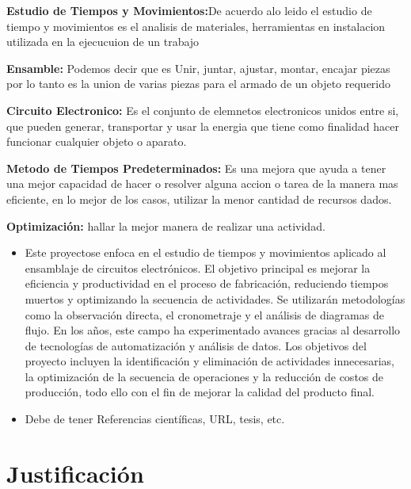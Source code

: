     \item \textbf{Estudio de Tiempos y Movimientos:}De acuerdo alo leido el estudio de tiempo y movimientos es el analisis de materiales, herramientas en instalacion utilizada en la ejecucuion de un trabajo 
    \item \textbf{Ensamble:} Podemos decir que es Unir, juntar, ajustar, montar, encajar piezas por lo tanto es la union de varias piezas para el armado de un objeto requerido
    \item \textbf{Circuito Electronico:} Es el conjunto de elemnetos electronicos unidos entre si, que pueden generar, transportar y usar la energia que tiene como finalidad hacer funcionar cualquier objeto o aparato. 
    \item \textbf{Metodo de Tiempos Predeterminados:}
    Es una mejora que ayuda a tener una mejor capacidad de hacer o resolver alguna accion o tarea de la manera mas eficiente, en lo mejor de los casos, utilizar la menor cantidad de recursos dados.
    \item \textbf{Optimización:}
    hallar la mejor manera de realizar una actividad.
    \begin{itemize}
        \item Este proyectose enfoca en el estudio de tiempos y movimientos aplicado al ensamblaje de circuitos electrónicos. El objetivo principal es mejorar la eficiencia y productividad en el proceso de fabricación, reduciendo tiempos muertos y optimizando la secuencia de actividades. Se utilizarán metodologías como la observación directa, el cronometraje y el análisis de diagramas de flujo. En los años, este campo ha experimentado avances gracias al desarrollo de tecnologías de automatización y análisis de datos. Los objetivos del proyecto incluyen la identificación y eliminación de actividades innecesarias, la optimización de la secuencia de operaciones y la reducción de costos de producción, todo ello con el fin de mejorar la calidad del producto final.
        \item Debe de tener Referencias científicas, URL, tesis, etc.
        
        \cite{RAE}
        
    \end{itemize}
    \section{Justificación}
    
